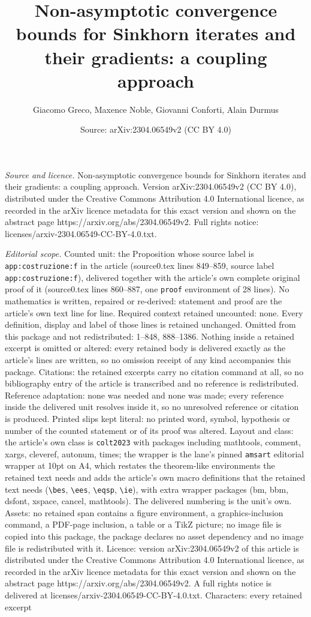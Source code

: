 \documentclass[10pt,a4paper]{amsart}
\title[Non-asymptotic convergence bounds for Sinkhorn iterates and ]{Non-asymptotic convergence bounds for Sinkhorn iterates and their gradients: a coupling approach}
\author{Giacomo Greco, Maxence Noble, Giovanni Conforti, Alain Durmus}
\date{Source: arXiv:2304.06549v2 (CC BY 4.0)}
\begin{document}
\maketitle

\noindent\emph{Source and licence.} Non-asymptotic convergence bounds for Sinkhorn iterates and their gradients: a coupling approach. Version arXiv:2304.06549v2 (CC BY 4.0), distributed under the Creative Commons Attribution 4.0 International licence, as recorded in the arXiv licence metadata for this exact version and shown on the abstract page https://arxiv.org/abs/2304.06549v2. Full rights notice: licenses/arxiv-2304.06549-CC-BY-4.0.txt.\par\smallskip

\noindent\textit{Editorial scope.} Counted unit: the Proposition whose source label is \texttt{app:costruzione:f} in the article (source0.tex lines 849--859, source label \texttt{app:costruzione:f}), delivered together with the article's own complete original proof of it (source0.tex lines 860--887, one \texttt{proof} environment of 28 lines). No mathematics is written, repaired or re-derived: statement and proof are the article's own text line for line. Required context retained uncounted: none. Every definition, display and label of those lines is retained unchanged. Omitted from this package and not redistributed: 1--848, 888--1386. Nothing inside a retained excerpt is omitted or altered: every retained body is delivered exactly as the article's lines are written, so no omission receipt of any kind accompanies this package. Citations: the retained excerpts carry no citation command at all, so no bibliography entry of the article is transcribed and no reference is redistributed. Reference adaptation: none was needed and none was made; every reference inside the delivered unit resolves inside it, so no unresolved reference or citation is produced. Printed slips kept literal: no printed word, symbol, hypothesis or number of the counted statement or of its proof was altered. Layout and class: the article's own class is \texttt{colt2023} with packages including mathtools, comment, xargs, cleveref, autonum, times; the wrapper is the lane's pinned \texttt{amsart} editorial wrapper at 10pt on A4, which restates the theorem-like environments the retained text needs and adds the article's own macro definitions that the retained text needs (\texttt{\textbackslash bes}, \texttt{\textbackslash ees}, \texttt{\textbackslash eqsp}, \texttt{\textbackslash ie}), with extra wrapper packages (bm, bbm, dsfont, xspace, cancel, mathtools). The delivered numbering is the unit's own. Assets: no retained span contains a figure environment, a graphics-inclusion command, a PDF-page inclusion, a table or a TikZ picture; no image file is copied into this package, the package declares no asset dependency and no image file is redistributed with it. Licence: version arXiv:2304.06549v2 of this article is distributed under the Creative Commons Attribution 4.0 International licence, as recorded in the arXiv licence metadata for this exact version and shown on the abstract page https://arxiv.org/abs/2304.06549v2. A full rights notice is delivered at licenses/arxiv-2304.06549-CC-BY-4.0.txt. Characters: every retained excerpt 
\end{document}
